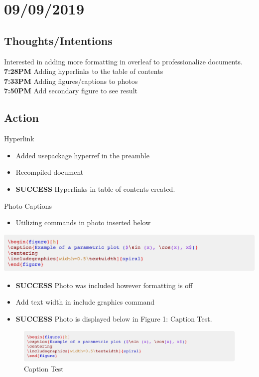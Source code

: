 \documentclass{article}
\begin{document}
\section{09/09/2019}
\subsection{Thoughts/Intentions}
Interested in adding more formatting in overleaf to professionalize documents. \\
\textbf{7:28PM} Adding hyperlinks to the table of contents \\
\textbf{7:33PM} Adding figures/captions to photos\\
\textbf{7:50PM} Add secondary figure to see result\\

\subsection{Action}
Hyperlink
\begin{itemize}
\item Added usepackage hyperref in the preamble
\item Recompiled document
\item \textbf{SUCCESS} Hyperlinks in table of contents created.
\end{itemize}
Photo Captions
\begin{itemize}
\item Utilizing commands in photo inserted below
\end{itemize}
\includegraphics[width=\textwidth]{Images/CaptionTest.png}\\
\begin{itemize}
\item \textbf{SUCCESS} Photo was included however formatting is off 
\item Add text width in include graphics command
\item \textbf{SUCCESS} Photo is displayed below in Figure 1: Caption Test.
\end{itemize}
\begin{figure}[H]
    \centering
    \includegraphics[width=\textwidth]{Images/CaptionTest.png}
    \caption{Caption Test}
    \label{fig:my_label}
\end{figure} 
\end{document}
